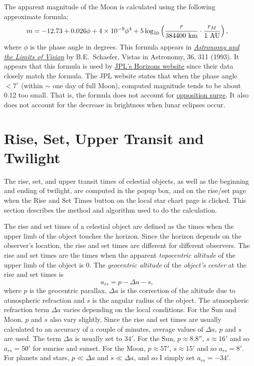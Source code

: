 \documentclass[12pt]{article}
\newcommand \beq {\begin{equation}}
\newcommand \eeq {\end{equation}}
\begin{document}
The apparent magnitude of the Moon is calculated using the following 
approximate formula:
\beq
  m = -12.73 + 0.026 \phi + 4\times 10^{-9} \phi^4 
+ 5\log_{10}\left( \frac{r}{384400~{\rm km}}\cdot \frac{r_M}{1~{\rm AU}}\right) ,
\eeq
where $\phi$ is the phase angle in degrees. This formula appears in 
\href{http://dust.ess.uci.edu/ppr/ppr_Sch93.pdf}{\it Astronomy and the 
Limits of Vision} by B.E.~Schaefer, Vistas in Astronomy, 36, 311 (1993). 
It appears that this formula is used by 
\href{https://ssd.jpl.nasa.gov/horizons.cgi}{JPL's Horizons website} 
since their data closely match the formula.
The JPL website states that when the phase angle $< 7^\circ$ (within $\sim$ one 
day of full Moon), computed magnitude tends to be about 0.12 too small. That is, 
the formula does not account for 
\href{https://en.wikipedia.org/wiki/Opposition_surge}{opposition surge}. 
It also does not account for 
the decrease in brightness when lunar eclipses occur.

\section{Rise, Set, Upper Transit and Twilight}

The rise, set, and upper transit times of celestial objects, as well as the beginning and 
ending of twilight, are computed in the popup box, and on the rise/set page when  
the Rise and Set Times button on the local star chart page is clicked. This section describes 
the method and algorithm used to do the calculation.

The rise and set times of a celestial object are defined as the times 
when the upper limb of the object touches the horizon.
Since the horizon depends on the observer's 
location, the rise and set times are different for different observers. 
The rise and set times are the times when the apparent {\em topocentric 
altitude} of the upper limb of the object is 0. 
The {\em geocentric altitude} of the {\em object's center} at the rise and set 
times is 
\beq
  a_{rs} = p - \Delta a - s , 
\eeq
where $p$ is the geocentric parallax, $\Delta a$ is the correction of the 
altitude due to atmospheric refraction and $s$ is the angular radius of the 
object. The atmospheric refraction term $\Delta a$ varies depending on the 
local conditions. For the Sun and Moon, $p$ and $s$ also vary slightly. Since 
the rise and set times are usually calculated to an accuracy of a couple of minutes, 
average values of $\Delta a$, $p$ and $s$ are used. The term $\Delta a$ is usually set 
to $34'$. For the Sun, $p \approx 8.8''$, $s\approx 16'$ and so $a_{rs}=50'$ for 
sunrise and sunset. For the Moon, $p\approx 57'$, $s\approx 15'$ and so $a_{rs}=8'$. 
For planets and stars, $p \ll \Delta a$ and $s \ll \Delta a$, and so I simply 
set $a_{rs}=-34'$. 
\end{document}
